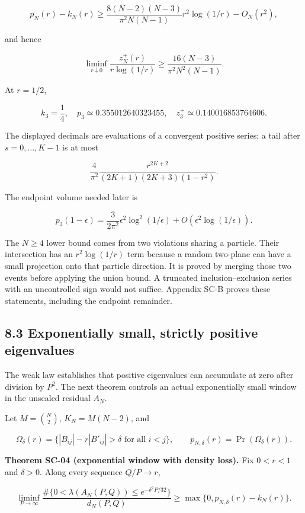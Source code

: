 \[
p_N(r)-k_N(r)\geq
\frac{8(N-2)(N-3)}{\pi^2N(N-1)}r^2\log(1/r)-O_N(r^2),
\]

and hence

\[
\liminf_{r\downarrow0}\frac{z_N^+(r)}{r\log(1/r)}
\geq\frac{16(N-3)}{\pi^2N^2(N-1)}.
\]

At \(r=1/2\),

\[
k_3=\frac14,\quad p_3\simeq0.355012640323455,\quad
z_3^+\simeq0.140016853764606.
\]

The displayed decimals are evaluations of a convergent positive series; a tail after \(s=0,\ldots,K-1\) is at most

\[
\frac4{\pi^2}\frac{r^{2K+2}}{(2K+1)(2K+3)(1-r^2)}.
\]

The endpoint volume needed later is

\[
p_3(1-\epsilon)=\frac{3}{2\pi^2}\epsilon^2\log^2(1/\epsilon)
+O\!\left(\epsilon^2\log(1/\epsilon)\right).
\]

The \(N\geq4\) lower bound comes from two violations sharing a particle. Their intersection has an \(r^2\log(1/r)\) term because a random two-plane can have a small projection onto that particle direction. It is proved by merging those two events before applying the union bound. A truncated inclusion--exclusion series with an uncontrolled sign would not suffice. Appendix SC-B proves these statements, including the endpoint remainder.

\hypertarget{exponentially-small-strictly-positive-eigenvalues}{%
\subsection{8.3 Exponentially small, strictly positive eigenvalues}\label{exponentially-small-strictly-positive-eigenvalues}}

The weak law establishes that positive eigenvalues can accumulate at zero after division by \(P^2\). The next theorem controls an actual exponentially small window in the unscaled residual \(A_N\).

Let \(M=\binom N2\), \(K_N=M(N-2)\), and

\[
\Omega_\delta(r)=\{|B_{ij}|-r|B'_{ij}|>\delta\text{ for all }i<j\},\qquad
p_{N,\delta}(r)=\Pr(\Omega_\delta(r)).
\]

\textbf{Theorem SC-04 (exponential window with density loss).} Fix \(0<r<1\) and \(\delta>0\). Along every sequence \(Q/P\to r\),

\[
\liminf_{P\to\infty}\frac{
\#\{0<\lambda(A_N(P,Q))\leq e^{-\delta^2P/32}\}}
{d_N(P,Q)}
\geq\max\{0,p_{N,\delta}(r)-k_N(r)\}.
\]

